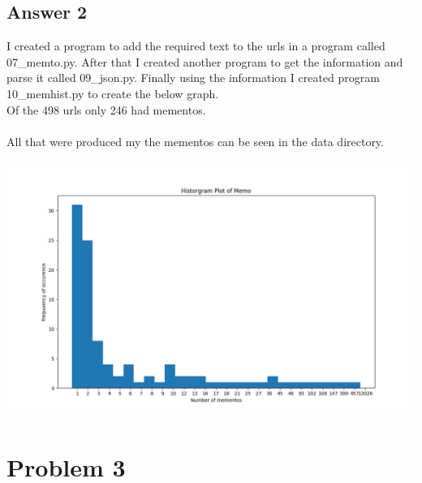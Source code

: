 \documentclass[10pt,letterpaper]{article}
\begin{document}
\subsection{Answer 2}
I created a program to add the required text to the urls in a program called 07\_memto.py.  After that I created another program to get the information and parse it called 09\_json.py.  Finally using the information I created program 10\_memhist.py to  create the below graph.\\
Of the 498 urls only 246 had mementos.\\
\\
All that were produced my the mementos can be seen in the data directory.\\ 
\\
\includegraphics[scale=.5]{histograph.png}
\\
\pagebreak%
\section{Problem 3}
\end{document}
